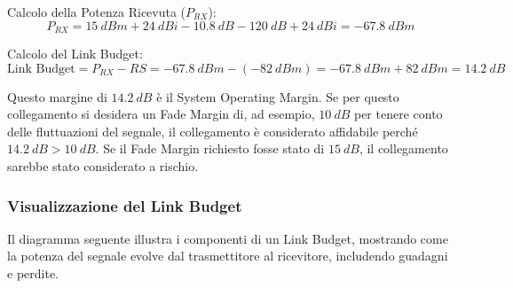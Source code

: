 Calcolo della Potenza Ricevuta ($P_{RX}$):
\[ P_{RX} = \SI{15}{dBm} + \SI{24}{dBi} - \SI{10.8}{dB} - \SI{120}{dB} + \SI{24}{dBi} = \SI{-67.8}{dBm} \]

Calcolo del Link Budget:
\[ \text{Link Budget} = P_{RX} - RS = \SI{-67.8}{dBm} - (\SI{-82}{dBm}) = \SI{-67.8}{dBm} + \SI{82}{dBm} = \SI{+14.2}{dB} \]

Questo margine di $\SI{14.2}{dB}$ è il System Operating Margin. Se per questo collegamento si desidera un Fade Margin di, ad esempio, $\SI{10}{dB}$ per tenere conto delle fluttuazioni del segnale, il collegamento è considerato affidabile perché $\SI{14.2}{dB} > \SI{10}{dB}$. Se il Fade Margin richiesto fosse stato di $\SI{15}{dB}$, il collegamento sarebbe stato considerato a rischio.

\subsubsection{Visualizzazione del Link Budget}
Il diagramma seguente illustra i componenti di un Link Budget, mostrando come la potenza del segnale evolve dal trasmettitore al ricevitore, includendo guadagni e perdite.

